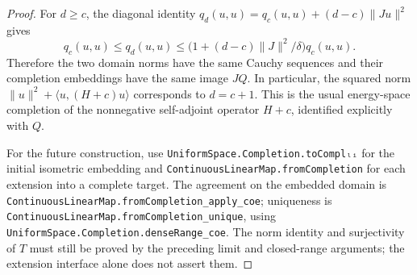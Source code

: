\documentclass[11pt,a4paper]{article}
\theoremstyle{definition}
\theoremstyle{remark}
\begin{document}
\begin{proof}
For $d\geq c$, the diagonal identity
$q_d(u,u)=q_c(u,u)+(d-c)\|Ju\|^2$ gives
\[
 q_c(u,u)\leq q_d(u,u)
 \leq\bigl(1+(d-c)\|J\|^2/\delta\bigr)q_c(u,u).
\]
Therefore the two domain norms have the same Cauchy sequences and
their completion embeddings have the same image $JQ$. In
particular, the squared norm
$\|u\|^2+\langle u,(H+c)u\rangle$ corresponds to $d=c+1$.
This is the usual energy-space completion of the nonnegative
self-adjoint operator $H+c$, identified explicitly with $Q$.

For the future construction, use
\nolinkurl{UniformSpace.Completion.toComplₗᵢ} for the initial
isometric embedding and
\nolinkurl{ContinuousLinearMap.fromCompletion} for each extension
into a complete target. The agreement on the embedded domain is
\nolinkurl{ContinuousLinearMap.fromCompletion_apply_coe}; uniqueness
is \nolinkurl{ContinuousLinearMap.fromCompletion_unique}, using
\nolinkurl{UniformSpace.Completion.denseRange_coe}.
The norm identity and surjectivity of $T$ must still be proved by
the preceding limit and closed-range arguments; the extension
interface alone does not assert them.
\end{proof}
\end{document}
